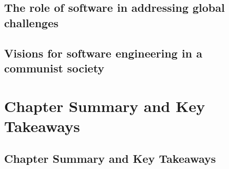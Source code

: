 \begin{refsection}
\begin{multicols}{2}
{\subsection{The role of software in addressing global challenges}
\subsection{Visions for software engineering in a communist society}

}
\newpage
\end{multicols}
\section{Chapter Summary and Key Takeaways}
\begin{multicols}{2}
{\small

\section{Chapter Summary and Key Takeaways}

}
\end{multicols}
\printbibliography[heading=subbibliography]
\end{refsection}